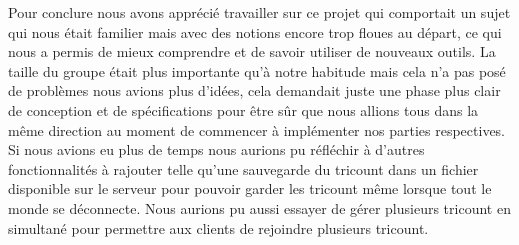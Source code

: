 \documentclass[12,french]{report}
\begin{document}
Pour conclure nous avons apprécié travailler sur ce projet qui comportait un sujet qui nous était familier mais avec des notions encore trop floues au départ, ce qui nous a permis de mieux comprendre et de savoir utiliser de nouveaux outils. La taille du groupe était plus importante qu'à notre habitude mais cela n'a pas posé de problèmes nous avions plus d'idées, cela demandait juste une phase plus clair de conception et de spécifications pour être sûr que nous allions tous dans la même direction au moment de commencer à implémenter nos parties respectives.\\
Si nous avions eu plus de temps nous aurions pu réfléchir à d'autres fonctionnalités à rajouter telle qu'une sauvegarde du tricount dans un fichier disponible sur le serveur pour pouvoir garder les tricount même lorsque tout le monde se déconnecte. 
Nous aurions pu aussi essayer de gérer plusieurs tricount en simultané pour permettre aux clients de rejoindre plusieurs tricount.
\end{document}
